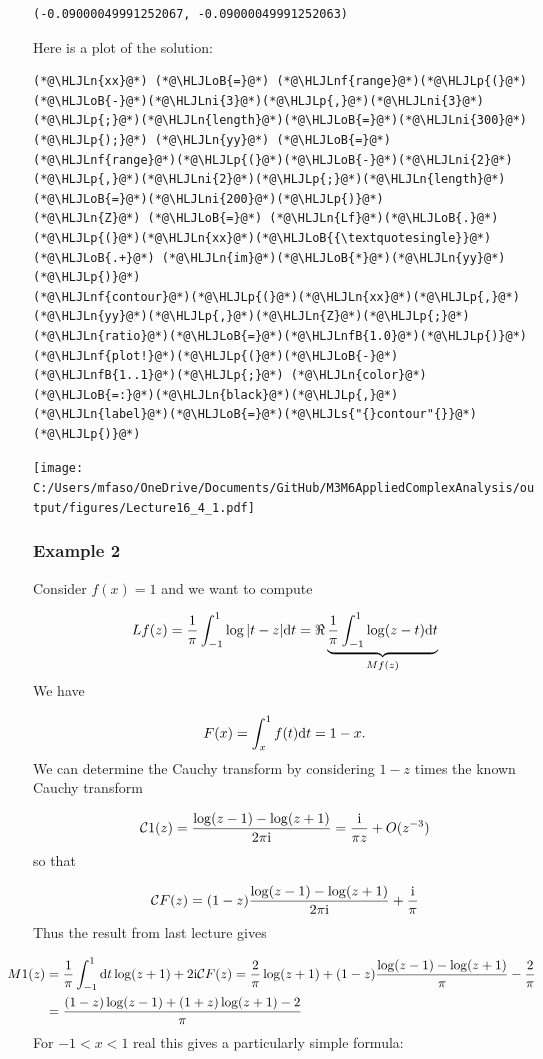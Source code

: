 \documentclass[12pt,landscape]{article}
\newcommand{\HLJLn}[1]{#1}
\newcommand{\HLJLnf}[1]{\textcolor[RGB]{66,102,213}{#1}}
\newcommand{\HLJLs}[1]{\textcolor[RGB]{201,61,57}{#1}}
\newcommand{\HLJLnfB}[1]{\textcolor[RGB]{59,151,46}{#1}}
\newcommand{\HLJLni}[1]{\textcolor[RGB]{59,151,46}{#1}}
\newcommand{\HLJLoB}[1]{\textcolor[RGB]{102,102,102}{\textbf{#1}}}
\newcommand{\HLJLp}[1]{#1}
\def\D{ {\rm d} }
\def\I{ {\rm i} }
\def\CC{ {\cal C} }
\begin{document}
{\begin{lstlisting}
(-0.09000049991252067, -0.09000049991252063)
\end{lstlisting}


Here is a plot of the solution:


\begin{lstlisting}
(*@\HLJLn{xx}@*) (*@\HLJLoB{=}@*) (*@\HLJLnf{range}@*)(*@\HLJLp{(}@*)(*@\HLJLoB{-}@*)(*@\HLJLni{3}@*)(*@\HLJLp{,}@*)(*@\HLJLni{3}@*)(*@\HLJLp{;}@*)(*@\HLJLn{length}@*)(*@\HLJLoB{=}@*)(*@\HLJLni{300}@*)(*@\HLJLp{);}@*) (*@\HLJLn{yy}@*) (*@\HLJLoB{=}@*) (*@\HLJLnf{range}@*)(*@\HLJLp{(}@*)(*@\HLJLoB{-}@*)(*@\HLJLni{2}@*)(*@\HLJLp{,}@*)(*@\HLJLni{2}@*)(*@\HLJLp{;}@*)(*@\HLJLn{length}@*)(*@\HLJLoB{=}@*)(*@\HLJLni{200}@*)(*@\HLJLp{)}@*)
(*@\HLJLn{Z}@*) (*@\HLJLoB{=}@*) (*@\HLJLn{Lf}@*)(*@\HLJLoB{.}@*)(*@\HLJLp{(}@*)(*@\HLJLn{xx}@*)(*@\HLJLoB{{\textquotesingle}}@*) (*@\HLJLoB{.+}@*) (*@\HLJLn{im}@*)(*@\HLJLoB{*}@*)(*@\HLJLn{yy}@*)(*@\HLJLp{)}@*)
(*@\HLJLnf{contour}@*)(*@\HLJLp{(}@*)(*@\HLJLn{xx}@*)(*@\HLJLp{,}@*)(*@\HLJLn{yy}@*)(*@\HLJLp{,}@*)(*@\HLJLn{Z}@*)(*@\HLJLp{;}@*)(*@\HLJLn{ratio}@*)(*@\HLJLoB{=}@*)(*@\HLJLnfB{1.0}@*)(*@\HLJLp{)}@*)
(*@\HLJLnf{plot!}@*)(*@\HLJLp{(}@*)(*@\HLJLoB{-}@*)(*@\HLJLnfB{1..1}@*)(*@\HLJLp{;}@*) (*@\HLJLn{color}@*)(*@\HLJLoB{=:}@*)(*@\HLJLn{black}@*)(*@\HLJLp{,}@*) (*@\HLJLn{label}@*)(*@\HLJLoB{=}@*)(*@\HLJLs{"{}contour"{}}@*)(*@\HLJLp{)}@*)
\end{lstlisting}

\texttt{[image: C:/Users/mfaso/OneDrive/Documents/GitHub/M3M6AppliedComplexAnalysis/output/figures/Lecture16\_4\_1.pdf]}

\subsubsection{Example 2}
Consider $f(x) = 1$ and we want to compute

\[
L f(z) = {1 \over \pi} \int_{-1}^1 \log|t-z| \D t = \Re \underbrace{{1 \over \pi} \int_{-1}^1 \log(z-t) \D t }_{M f(z)}
\]
We have

\[
F(x) = \int_x^1 f(t) \D t = 1-x.
\]
We can determine the Cauchy transform by considering $1-z$ times the known Cauchy transform

\[
\CC 1(z) = {\log(z-1) - \log(z+1) \over 2 \pi \I} = {\I  \over  \pi z} + O(z^{-3})
\]
so that

\[
\CC F(z) =  (1-z) {\log(z-1) - \log(z+1) \over 2 \pi \I} + {\I \over \pi}
\]
Thus the result from last lecture gives


\begin{align*}
\hspace*{-0.7cm} M 1(z) &= {1 \over \pi} \int_{-1}^1  \D t \log(z+1)+ 2 \I \CC F(z) = {2 \over \pi} \log(z+1) +
(1-z) {\log(z-1) - \log(z+1) \over \pi} - {2 \over \pi} \\
&= {(1-z) \log(z-1) + (1+z) \log(z+1) -2 \over \pi}
\end{align*}
For $-1 < x < 1$ real this gives a particularly simple formula:

}
\end{document}
